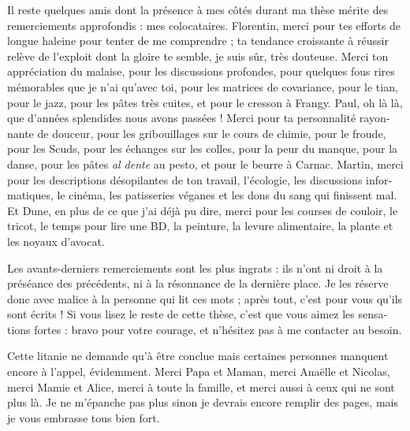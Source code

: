\begin{otherlanguage}{french}
Il reste quelques amis dont la présence à mes côtés durant ma thèse mérite des remerciements approfondis : mes colocataires. Florentin, merci pour tes efforts de longue haleine pour tenter de me comprendre ; ta tendance croissante à réussir relève de l'exploit dont la gloire te semble, je suis sûr, très douteuse. Merci ton appréciation du malaise, pour les discussions profondes, pour quelques fous rires mémorables que je n'ai qu'avec toi, pour les matrices de covariance, pour le tian, pour le jazz, pour les pâtes très cuites, et pour le cresson à Frangy. Paul, oh là là, que d'années splendides nous avons passées ! Merci pour ta personnalité rayonnante de douceur, pour les gribouillages sur le cours de chimie, pour le froude, pour les Scuds, pour les échanges sur les colles, pour la peur du manque, pour la danse, pour les pâtes \textit{al dente} au pesto, et pour le beurre à Carnac. Martin, merci pour les descriptions désopilantes de ton travail, l'écologie, les discussions informatiques, le cinéma, les patisseries véganes et les dons du sang qui finissent mal. Et Dune, en plus de ce que j'ai déjà pu dire, merci pour les courses de couloir, le tricot, le temps pour lire une BD, la peinture, la levure alimentaire, la plante et les noyaux d'avocat.

Les avants-derniers remerciements sont les plus ingrats : ils n'ont ni droit à la préséance des précédents, ni à la résonnance de la dernière place. Je les réserve donc avec malice à la personne qui lit ces mots ; après tout, c'est pour vous qu'ils sont écrits ! Si vous lisez le reste de cette thèse, c'est que vous aimez les sensations fortes : bravo pour votre courage, et n'hésitez pas à me contacter au besoin.

Cette litanie ne demande qu'à être conclue mais certaines personnes manquent encore à l'appel, évidemment. Merci Papa et Maman, merci Anaëlle et Nicolas, merci Mamie et Alice, merci à toute la famille, et merci aussi à ceux qui ne sont plus là. Je ne m'épanche pas plus sinon je devrais encore remplir des pages, mais je vous embrasse tous bien fort.


\endgroup
\newpage
\cleardoublepage

%
%
%
%
%
%
%

\end{otherlanguage}
